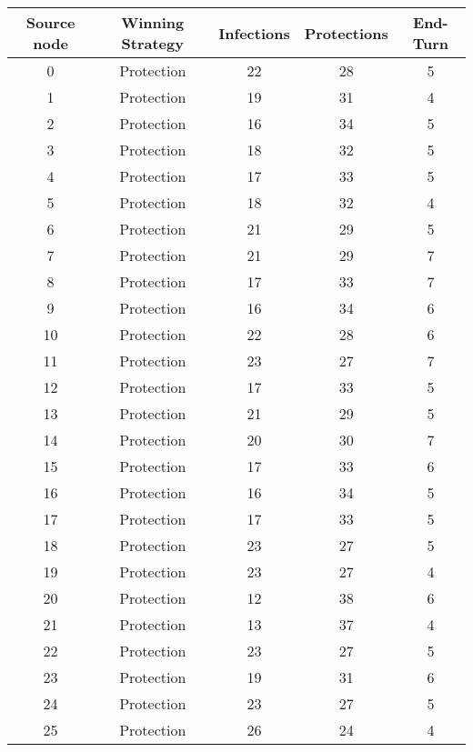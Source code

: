 \documentclass[results.tex]{subfiles}
\begin{document}
\begin{center}
  \begin{tabular}{| c || c | c | c | c |}
    \hline
    {\bfseries Source node} & {\bfseries Winning Strategy} & {\bfseries Infections} & {\bfseries Protections} & {\bfseries End-Turn} \\  %
    \hline\hline
    0 & Protection & 22 & 28 & 5 \\ 
    \hline
    1 & Protection & 19 & 31 & 4 \\ 
    \hline
    2 & Protection & 16 & 34 & 5 \\ 
    \hline
    3 & Protection & 18 & 32 & 5 \\ 
    \hline
    4 & Protection & 17 & 33 & 5 \\ 
    \hline
    5 & Protection & 18 & 32 & 4 \\ 
    \hline
    6 & Protection & 21 & 29 & 5 \\ 
    \hline
    7 & Protection & 21 & 29 & 7 \\ 
    \hline
    8 & Protection & 17 & 33 & 7 \\ 
    \hline
    9 & Protection & 16 & 34 & 6 \\ 
    \hline
    10 & Protection & 22 & 28 & 6 \\ 
    \hline
    11 & Protection & 23 & 27 & 7 \\ 
    \hline
    12 & Protection & 17 & 33 & 5 \\ 
    \hline
    13 & Protection & 21 & 29 & 5 \\ 
    \hline
    14 & Protection & 20 & 30 & 7 \\ 
    \hline
    15 & Protection & 17 & 33 & 6 \\ 
    \hline
    16 & Protection & 16 & 34 & 5 \\ 
    \hline
    17 & Protection & 17 & 33 & 5 \\ 
    \hline
    18 & Protection & 23 & 27 & 5 \\ 
    \hline
    19 & Protection & 23 & 27 & 4 \\ 
    \hline
    20 & Protection & 12 & 38 & 6 \\ 
    \hline
    21 & Protection & 13 & 37 & 4 \\ 
    \hline
    22 & Protection & 23 & 27 & 5 \\ 
    \hline
    23 & Protection & 19 & 31 & 6 \\ 
    \hline
    24 & Protection & 23 & 27 & 5 \\ 
    \hline
    25 & Protection & 26 & 24 & 4 \\ 

\end{tabular}
\end{center}
\end{document}
